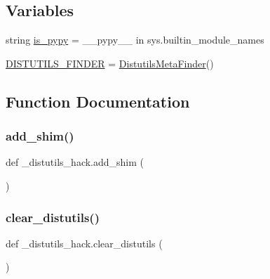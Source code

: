 \subsection*{Variables}
\begin{DoxyCompactItemize}
\item 
string \hyperlink{namespace__distutils__hack_a554235261bbfd9d8f098e1cb653eeaab}{is\+\_\+pypy} = \textquotesingle{}\+\_\+\+\_\+pypy\+\_\+\+\_\+\textquotesingle{} in sys.\+builtin\+\_\+module\+\_\+names
\item 
\hyperlink{namespace__distutils__hack_afca68fec42cc3c93d4ba68e039eb3749}{D\+I\+S\+T\+U\+T\+I\+L\+S\+\_\+\+F\+I\+N\+D\+ER} = \hyperlink{class__distutils__hack_1_1DistutilsMetaFinder}{Distutils\+Meta\+Finder}()
\end{DoxyCompactItemize}


\subsection{Function Documentation}
\mbox{\label{namespace__distutils__hack_a08c2f18dc39845f0f7198d0b68299660}} 
\subsubsection{\texorpdfstring{add\+\_\+shim()}{add\_shim()}}
{\footnotesize\ttfamily def \+\_\+distutils\+\_\+hack.\+add\+\_\+shim (\begin{DoxyParamCaption}{ }\end{DoxyParamCaption})}

\mbox{\label{namespace__distutils__hack_ac28df4321677f0863bfbb1e2b73c7002}} 
\subsubsection{\texorpdfstring{clear\+\_\+distutils()}{clear\_distutils()}}
{\footnotesize\ttfamily def \+\_\+distutils\+\_\+hack.\+clear\+\_\+distutils (\begin{DoxyParamCaption}{ }\end{DoxyParamCaption})}

